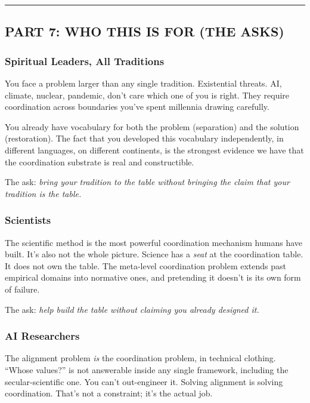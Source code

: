 \documentclass[
]{article}
\begin{document}
\begin{center}\rule{0.5\linewidth}{0.5pt}\end{center}

\subsection{PART 7: WHO THIS IS FOR (THE
ASKS)}\label{part-7-who-this-is-for-the-asks}

\subsubsection{Spiritual Leaders, All
Traditions}\label{spiritual-leaders-all-traditions}

You face a problem larger than any single tradition. Existential
threats. AI, climate, nuclear, pandemic, don't care which one of you is
right. They require coordination across boundaries you've spent
millennia drawing carefully.

You already have vocabulary for both the problem (separation) and the
solution (restoration). The fact that you developed this vocabulary
independently, in different languages, on different continents, is the
strongest evidence we have that the coordination substrate is real and
constructible.

The ask: \emph{bring your tradition to the table without bringing the
claim that your tradition is the table.}

\subsubsection{Scientists}\label{scientists}

The scientific method is the most powerful coordination mechanism humans
have built. It's also not the whole picture. Science has a \emph{seat}
at the coordination table. It does not own the table. The meta-level
coordination problem extends past empirical domains into normative ones,
and pretending it doesn't is its own form of failure.

The ask: \emph{help build the table without claiming you already
designed it.}

\subsubsection{AI Researchers}\label{ai-researchers}

The alignment problem \emph{is} the coordination problem, in technical
clothing. ``Whose values?'' is not answerable inside any single
framework, including the secular-scientific one. You can't out-engineer
it. Solving alignment is solving coordination. That's not a constraint;
it's the actual job.
\end{document}
